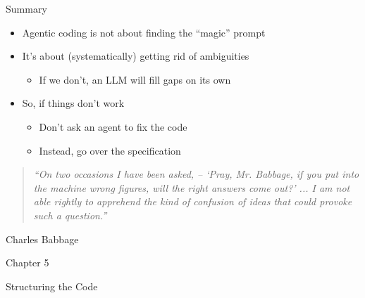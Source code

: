 \documentclass[
ps,
]{prosper}
\begin{document}
\begin{slide}{Summary}

\begin{itemize}

\item Agentic coding is not about finding the ``magic'' prompt

\item It's about (systematically) getting rid of ambiguities

  \begin{itemize}
    
  \item If we don't, an LLM will fill gaps on its own
    
  \end{itemize}
  
\item So, if things don't work

  \begin{itemize}
    
  \item Don't ask an agent to fix the code

  \item Instead, go over the specification
    
  \end{itemize}
  
\end{itemize}

\vspace*{.2cm}

\begin{scriptsize}
\begin{quote}
\emph{``On two occasions I have been asked, – `Pray, Mr. Babbage, if you put into the machine wrong figures, will the right answers come out?' ... I am not able rightly to apprehend the kind of confusion of ideas that could provoke such a question.''}
\end{quote}
\hfill Charles Babbage
\end{scriptsize}



\end{slide}





\begin{slide}{Chapter 5}

\vspace*{2cm}

\begin{center}
\begin{Huge}
Structuring the Code
\end{Huge}
\end{center}

\end{slide}
\end{document}
